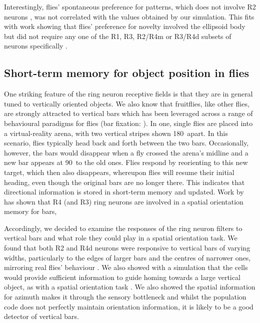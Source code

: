 Interestingly, flies' spontaneous preference for patterns, which does not involve R2 neurons \cite{Ernst1999}, was not correlated with the values obtained by our simulation. This fits with work showing that flies' preference for novelty involved the ellipsoid body but did not require any one of the R1, R3, R2/R4m or R3/R4d subsets of neurons specifically \cite{Solanki2015}.

\subsection{Short-term memory for object position in flies}

One striking feature of the ring neuron receptive fields is that they are in general tuned to vertically oriented objects.
We also know that fruitflies, like other flies, are strongly attracted to vertical bars which has been leveraged across a range of behavioural paradigms for flies (bar fixation: \cite{Neuser2008}). In one, single flies are placed into a virtual-reality arena, with two vertical stripes shown 180\degree\ apart.
In this scenario, flies typically head back and forth between the two bars.
Occasionally, however, the bars would disappear when a fly crossed the arena's midline and a new bar appears at 90\degree\ to the old ones.
Flies respond by reorienting to this new target, which then also disappears, whereupon flies will resume their initial heading, even though the original bars are no longer there. This indicates that directional information is stored in short-term memory and updated. Work by  has shown that R4 (and R3) ring neurons are involved in a spatial orientation memory for bars, 

Accordingly, we decided to examine the responses of the ring neuron filters to vertical bars and what role they could play in a spatial orientation task.
We found that both R2 and R4d neurons were responsive to vertical bars of varying widths, particularly to the edges of larger bars and the centres of narrower ones, mirroring real flies' behaviour \cite{Osorio1990}.
We also showed with a simulation that the cells would provide sufficient information to guide homing towards a large vertical object, as with a spatial orientation task \cite{Neuser2008}.
We also showed the spatial information for azimuth makes it through the sensory bottleneck and whilst the population code does not perfectly maintain orientation information, it is likely to be a good detector of vertical bars.

